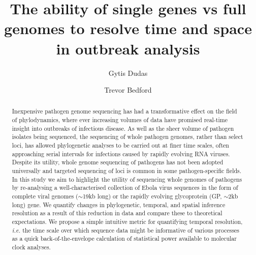 \documentclass[11pt,oneside,letterpaper]{article}
\title{\vspace{1.0cm} \LARGE \bf The ability of single genes vs full genomes to resolve time and space in outbreak analysis}
\author[1,2$\ast$]{Gytis Dudas}
\author[1]{Trevor Bedford}
\affil[1]{Vaccine and Infectious Disease Division, Fred Hutchinson Cancer Research Center, Seattle, WA, USA}
\affil[2]{Gothenburg Global Biodiversity Center, Gothenburg, Sweden}
\affil[$\ast$]{Corresponding author (gdudas@fredhutch.org)}
\def\tbc#1{\textcolor{purple}{[#1]}}
\begin{document}
\maketitle

\begin{abstract}
Inexpensive pathogen genome sequencing has had a transformative effect on the field of phylodynamics, where ever increasing volumes of data have promised real-time insight into outbreaks of infectious disease.
As well as the sheer volume of pathogen isolates being sequenced, the sequencing of whole pathogen genomes, rather than select loci, has allowed phylogenetic analyses to be carried out at finer time scales, often approaching serial intervals for infections caused by rapidly evolving RNA viruses.
Despite its utility, whole genome sequencing of pathogens has not been adopted universally and targeted sequencing of loci is common in some pathogen-specific fields.
In this study we aim to highlight the utility of sequencing whole genomes of pathogens by re-analysing a well-characterised collection of Ebola virus sequences in the form of complete viral genomes ($\sim$19kb long) or the rapidly evolving glycoprotein (GP, $\sim$2kb long) gene.
We quantify changes in phylogenetic, temporal, and spatial inference resolution as a result of this reduction in data and compare these to theoretical expectations.
We propose a simple intuitive metric for quantifying temporal resolution, \textit{i.e.} the time scale over which sequence data might be informative of various processes as a quick back-of-the-envelope calculation of statistical power available to molecular clock analyses.

\end{abstract}
\end{document}
